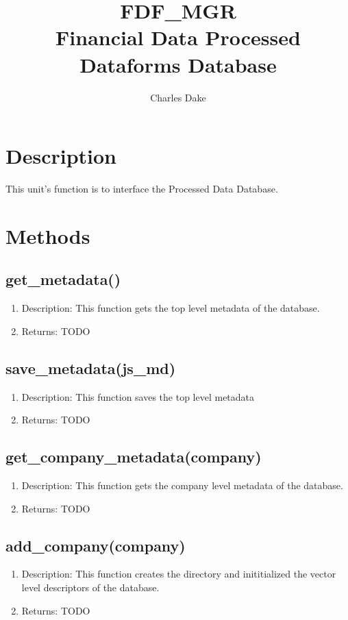 \documentclass{article}
\title{FDF_MGR \\ Financial Data Processed Dataforms Database}
\author{Charles Dake}
\begin{document}
\section{Description}
This unit's function is to interface the Processed Data Database. 


\section{Methods}
\subsection{get_metadata()}
\begin{enumerate}
\item Description: This function gets the top level metadata of the database.
\item Returns: 
TODO
\end{enumerate}

\subsection{save_metadata(js_md)}
\begin{enumerate}
\item Description: This function saves the top level metadata
\item Returns: 
TODO
\end{enumerate}

\subsection{get_company_metadata(company)}
\begin{enumerate}
\item Description: This function gets the company level metadata of the database.
\item Returns: 
TODO
\end{enumerate}

\subsection{add_company(company)}
\begin{enumerate}
\item Description: This function creates the directory and inititialized the vector level descriptors of the database.
\item Returns: 
TODO
\end{enumerate}
\end{document}
